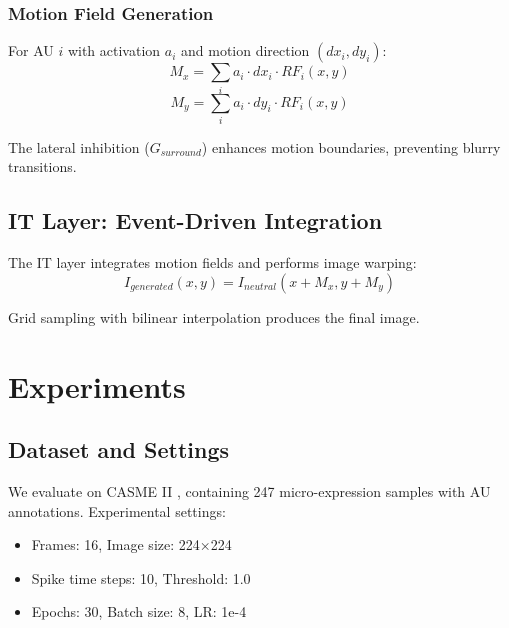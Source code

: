 \documentclass[preprint,12pt]{elsarticle}
\begin{document}
\subsubsection{Motion Field Generation}

For AU $i$ with activation $a_i$ and motion direction $(dx_i, dy_i)$:
\begin{equation}
M_x = \sum_i a_i \cdot dx_i \cdot RF_i(x,y)
\end{equation}
\begin{equation}
M_y = \sum_i a_i \cdot dy_i \cdot RF_i(x,y)
\end{equation}

The lateral inhibition ($G_{surround}$) enhances motion boundaries,
preventing blurry transitions.

\subsection{IT Layer: Event-Driven Integration}
\label{sec:it}

The IT layer integrates motion fields and performs image warping:
\begin{equation}
I_{generated}(x,y) = I_{neutral}(x + M_x, y + M_y)
\end{equation}

Grid sampling with bilinear interpolation produces the final image.

\section{Experiments}
\label{sec:experiments}

\subsection{Dataset and Settings}

We evaluate on CASME II \cite{casme2}, containing 247 micro-expression samples
with AU annotations. Experimental settings:
\begin{itemize}
\item Frames: 16, Image size: 224×224
\item Spike time steps: 10, Threshold: 1.0
\item Epochs: 30, Batch size: 8, LR: 1e-4
\end{itemize}
\end{document}
